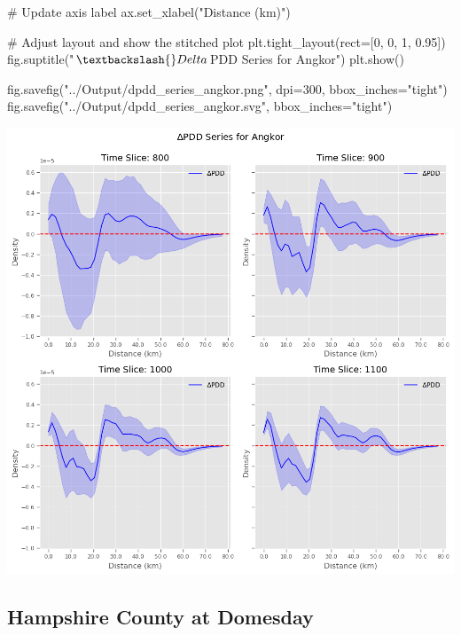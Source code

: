 \documentclass[
  11pt,
  letterpaper,
  DIV=11,
  numbers=noendperiod]{scrartcl}
\newenvironment{Shaded}{\begin{snugshade}}{\end{snugshade}}
\newcommand{\CommentTok}[1]{\textcolor[rgb]{0.37,0.37,0.37}{#1}}
\newcommand{\DecValTok}[1]{\textcolor[rgb]{0.68,0.00,0.00}{#1}}
\newcommand{\FloatTok}[1]{\textcolor[rgb]{0.68,0.00,0.00}{#1}}
\newcommand{\NormalTok}[1]{\textcolor[rgb]{0.00,0.23,0.31}{#1}}
\newcommand{\OperatorTok}[1]{\textcolor[rgb]{0.37,0.37,0.37}{#1}}
\newcommand{\StringTok}[1]{\textcolor[rgb]{0.13,0.47,0.30}{#1}}
\begin{document}
\begin{Shaded}
\begin{Highlighting}[]
    \CommentTok{\# Update axis label}
\NormalTok{    ax.set\_xlabel(}\StringTok{"Distance (km)"}\NormalTok{)}

\CommentTok{\# Adjust layout and show the stitched plot}
\NormalTok{plt.tight\_layout(rect}\OperatorTok{=}\NormalTok{[}\DecValTok{0}\NormalTok{, }\DecValTok{0}\NormalTok{, }\DecValTok{1}\NormalTok{, }\FloatTok{0.95}\NormalTok{])}
\NormalTok{fig.suptitle(}\StringTok{"$\textbackslash{}Delta$PDD Series for Angkor"}\NormalTok{)}
\NormalTok{plt.show()}

\NormalTok{fig.savefig(}\StringTok{"../Output/dpdd\_series\_angkor.png"}\NormalTok{, dpi}\OperatorTok{=}\DecValTok{300}\NormalTok{, bbox\_inches}\OperatorTok{=}\StringTok{"tight"}\NormalTok{)}
\NormalTok{fig.savefig(}\StringTok{"../Output/dpdd\_series\_angkor.svg"}\NormalTok{, bbox\_inches}\OperatorTok{=}\StringTok{"tight"}\NormalTok{)}
\end{Highlighting}
\end{Shaded}

\includegraphics{analysis_files/figure-pdf/cell-17-output-1.png}

\subsection{Hampshire County at
Domesday}\label{hampshire-county-at-domesday}
\end{document}
